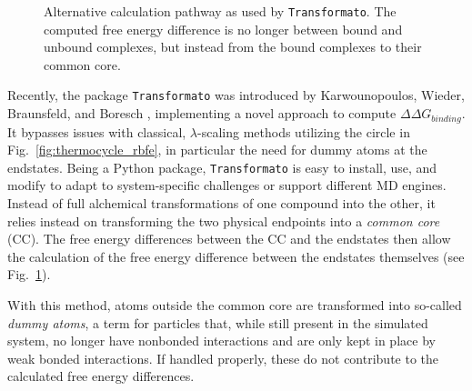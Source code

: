 \documentclass[oneside]{scrreprt}
\begin{document}
\begin{figure}[H]
    \centering
    \caption{Alternative calculation pathway as used by \texttt{Transformato}. The computed free energy difference is no longer between bound and unbound complexes, but instead from the bound complexes to their common core.}
    \label{fig:thermocycle_transformato}
\end{figure}

Recently, the package \texttt{Transformato} was introduced by Karwounopoulos, Wieder, Braunsfeld, and Boresch \cite{karwounopoulos_relative_2022,braunsfeldImplementationTestingCHARMM,Wieder2022Jun}, implementing a novel approach to compute $\Delta\Delta G_{binding}$. It bypasses issues with classical, $\lambda$-scaling methods utilizing the circle in Fig.~\ref{fig:thermocycle_rbfe}, in particular the need for dummy atoms at the endstates. Being a Python package, \texttt{Transformato} is easy to install, use, and modify to adapt to system-specific challenges or support different MD engines. Instead of full alchemical transformations of one compound into the other, it  relies instead on transforming the two physical endpoints into a \emph{common core} (CC). The free energy differences between the CC and the endstates then allow the calculation of the free energy difference between the endstates themselves (see Fig.~\ref{fig:thermocycle_transformato}).



With this method, atoms outside the common core are transformed into so-called \emph{dummy atoms}, a term for particles that, while still present in the simulated system, no longer have nonbonded interactions and are only kept in place by weak bonded interactions. If handled properly, these do not contribute to the calculated free energy differences\cite{fleckDummyAtomsAlchemical2021}.
\end{document}
